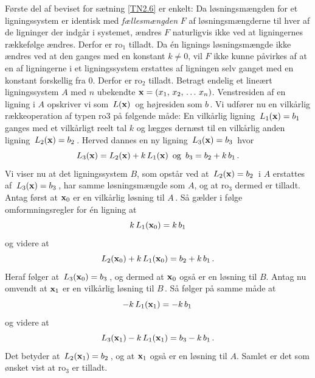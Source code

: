 \begin{bevis}%
Første del af beviset for sætning \ref{TN2.6} er enkelt: Da løsningsmængden for et ligningssystem er identisk med \emph{fællesmængden} $F$ af løsningsmængderne til hver af de ligninger der indgår i systemet, ændres $F$ naturligvis ikke ved at ligningernes rækkefølge ændres. Derfor er ro$_1$ tilladt.\bs
Da én lignings løsningsmængde ikke ændres ved at den ganges med en konstant $k\neq 0$, vil $F$ ikke kunne påvirkes af at en af ligningerne i et ligningssystem erstattes af ligningen selv ganget med en konstant forskellig fra $0$. Derfor er ro$_2$ tilladt.\bs
Betragt endelig et lineært ligningssystem $A$ med $n$ ubekendte $\mathbf{x}=(x_1,\,x_2,\,\ldots\,x_n)$. Venstresiden af en ligning i $A$ opskriver vi som $\,L(\mathbf{x})\,$ og højresiden som $b\,$. Vi udfører nu en vilkårlig rækkeoperation af typen ro$3$ på følgende måde: En vilkårlig ligning $\,L_1(\mathbf{x})=b_1\,$ ganges med et vilkårligt reelt tal $k$ og lægges dernæst til en vilkårlig anden ligning $\,L_2(\mathbf{x})=b_2\,$. Herved dannes en ny ligning $\,L_3(\mathbf{x})=b_3\,$ hvor
$$L_3(\mathbf{x})=L_2(\mathbf{x})+k\,L_1(\mathbf{x})\,\,\,\mathrm{og}\,\,\,b_3=b_2+k\,b_1\,.
$$
Vi viser nu at det ligningssystem $B$, som opstår ved at $\,L_2(\mathbf{x})=b_2\,$ i $A$ erstattes af $\,L_3(\mathbf{x})=b_3\,$, har samme løsningsmængde som $A$, og at ro$_3$ dermed er tilladt. Antag først at $\mathbf{x}_0$ er en vilkårlig løsning til $A\,$. Så gælder i følge omformningsregler for én ligning at 
$$k\,L_1(\mathbf{x}_0)=k\,b_1$$
og videre at  
$$L_2(\mathbf{x}_0)+k\,L_1(\mathbf{x}_0)=b_2+k\,b_1\,.$$
Heraf følger at $\,L_3(\mathbf{x}_0)=b_3\,$, og dermed at $\mathbf{x}_0$ også er en løsning til $B$. Antag nu omvendt at $\mathbf{x}_1$ er en vilkårlig løsning til $B\,$. Så følger på samme måde at $$-k\,L_1(\mathbf{x}_1)=-k\,b_1\,$$ og videre at $$L_3(\mathbf{x}_1)-k\,L_1(\mathbf{x}_1)=b_3-k\,b_1\,.$$
Det betyder at $\,L_2(\mathbf{x}_1)=b_2\,$, og at $\mathbf{x}_1$ også er en løsning til $A$. Samlet er det som ønsket vist at ro$_3$ er tilladt.



\end{bevis}
